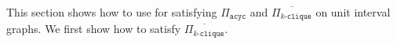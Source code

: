 This section shows how to use  for satisfying $\Pi_{\texttt{acyc}}$ and $\overline{\Pi_{k\texttt{-clique}}}$ on unit interval graphs. 
We first show how to satisfy $\overline{\Pi_{k\texttt{-clique}}}$. %


